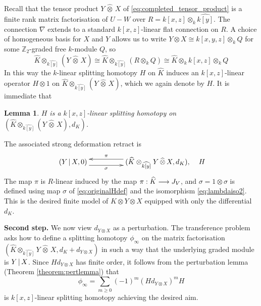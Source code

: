 \documentclass[english,letter paper,12pt,leqno]{article}
\newtheorem{lemma}[theorem]{Lemma}
\theoremstyle{example}
\numberwithin{equation}{section}
\begin{document}
Recall that the tensor product $Y \,\widehat{\otimes}\, X$ of \eqref{eq:completed_tensor_product} is a finite rank matrix factorisation of $U - W$ over $R = k[x,z] \otimes_k \widehat{k[y]}$. The connection $\nabla$ extends to a standard $k[x,z]$-linear flat connection on $R$. A choice of homogeneous basis for $X$ and $Y$ allows us to write $Y \otimes X \cong k[x,y,z] \otimes_k Q$ for some $\mathbb{Z}_2$-graded free $k$-module $Q$, so
\begin{equation}\label{eq:lambdaiso2}
\widehat{K} \otimes_{\widehat{k[y]}}( Y \,\widehat{\otimes}\, X ) \cong \widehat{K} \otimes_{\widehat{k[y]}} (R \otimes_k Q) \cong \widehat{K} \otimes_k k[x,z] \otimes_k Q
\end{equation}
In this way the $k$-linear splitting homotopy $H$ on $\widehat{K}$ induces an $k[x,z]$-linear operator $H \otimes 1$ on $\widehat{K} \otimes_{\widehat{k[y]}}( Y \,\widehat{\otimes}\, X)$, which we again denote by $H$. It is immediate that

\begin{lemma} $H$ is a $k[x,z]$-linear splitting homotopy on $(\widehat{K} \otimes_{\widehat{k[y]}} ( Y \,\widehat{\otimes}\, X ), d_K)$.
\end{lemma}

The associated strong deformation retract is
\[
\xymatrix@C+2pc{
(Y \l X,0) \ar@<-1ex>[r]_-{\sigma} & (\widehat{K} \otimes_{\widehat{k[y]}} Y \,\widehat{\otimes}\, X, d_K), \ar@<-1ex>[l]_-{\pi}
} \quad H
\]
The map $\pi$ is $R$-linear induced by the map $\pi: \widehat{K} \longrightarrow J_V$, and $\sigma = 1 \otimes \sigma$ is defined using map $\sigma$ of \eqref{eq:originalHdef} and the isomorphism \eqref{eq:lambdaiso2}. This is the desired finite model of $K \otimes Y \otimes X$ equipped with only the differential $d_K$. 

\vspace{0.3cm}

\textbf{Second step.} We now view $d_{Y \otimes X}$ as a perturbation. The transference problem asks how to define a splitting homotopy $\phi_\infty$ on the matrix factorisation $(\widehat{K} \otimes_{\widehat{k[y]}} Y \,\widehat{\otimes}\, X , d_K + d_{Y \otimes X})$ in such a way that the underlying graded module is $Y \,|\, X$. Since $H d_{Y \otimes X}$ has finite order, it follows from the perturbation lemma (Theorem \ref{theorem:pertlemma}) that
\[
\phi_\infty = \sum_{m \ge 0} (-1)^m (H d_{Y \otimes X})^m H
\]
is $k[x,z]$-linear splitting homotopy achieving the desired aim.
\end{document}
